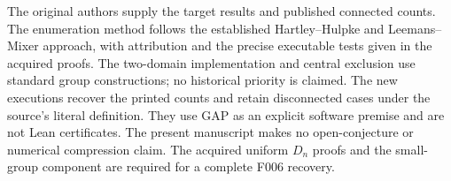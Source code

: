 \documentclass[11pt,a4paper]{article}
\begin{document}
The original authors supply the target results and published
connected counts. The enumeration method follows the established
Hartley--Hulpke and Leemans--Mixer approach, with attribution and
the precise executable tests given in the acquired proofs. The
two-domain implementation and central exclusion use standard
group constructions; no historical priority is claimed. The new
executions recover the printed counts and retain disconnected
cases under the source's literal definition. They use GAP as an
explicit software premise and are not Lean certificates.
The present manuscript makes no open-conjecture or numerical
compression claim. The acquired uniform $D_n$ proofs and the
small-group component are required for a complete F006 recovery.
\end{document}
